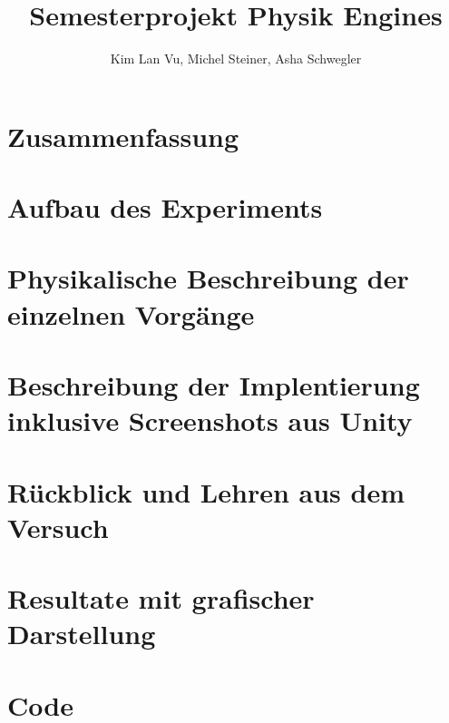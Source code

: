 \documentclass{article}[11pt,paper=A4, margin=1cm]
\title{Semesterprojekt Physik Engines}
\author{Kim Lan Vu, Michel Steiner, Asha Schwegler}
\begin{document}
\maketitle
\newpage

\tableofcontents



\newpage

\section {Zusammenfassung}


\section {Aufbau des Experiments}


\section {Physikalische Beschreibung der einzelnen Vorgänge}


\section {Beschreibung der Implentierung inklusive Screenshots aus Unity}


\section {Rückblick und Lehren aus dem Versuch}


\section {Resultate mit grafischer Darstellung}

\newpage
\section {Code}


\appendix
%

\newpage
\listoffigures

\newpage

\printbibliography
\end{document}
